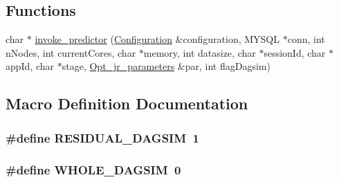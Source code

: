 \subsection*{Functions}
\begin{DoxyCompactItemize}
\item 
char $\ast$ \hyperlink{invoke__predictor_8hh_a08c78503a3848b016487ab7d31fd9074}{invoke\-\_\-predictor} (\hyperlink{classConfiguration}{Configuration} \&configuration, M\-Y\-S\-Q\-L $\ast$conn, int n\-Nodes, int current\-Cores, char $\ast$memory, int datasize, char $\ast$session\-Id, char $\ast$app\-Id, char $\ast$stage, \hyperlink{classOpt__jr__parameters}{Opt\-\_\-jr\-\_\-parameters} \&par, int flag\-Dagsim)
\end{DoxyCompactItemize}


\subsection{Macro Definition Documentation}
\hypertarget{invoke__predictor_8hh_a016c9fba38e790ceafd4d9843f2dc564}{
\subsubsection[{R\-E\-S\-I\-D\-U\-A\-L\-\_\-\-D\-A\-G\-S\-I\-M}]{\setlength{\rightskip}{0pt plus 5cm}\#define R\-E\-S\-I\-D\-U\-A\-L\-\_\-\-D\-A\-G\-S\-I\-M~1}}\label{invoke__predictor_8hh_a016c9fba38e790ceafd4d9843f2dc564}
\hypertarget{invoke__predictor_8hh_a3806de5f70b6971cfe8be82520f4bf2a}{
\subsubsection[{W\-H\-O\-L\-E\-\_\-\-D\-A\-G\-S\-I\-M}]{\setlength{\rightskip}{0pt plus 5cm}\#define W\-H\-O\-L\-E\-\_\-\-D\-A\-G\-S\-I\-M~0}}\label{invoke__predictor_8hh_a3806de5f70b6971cfe8be82520f4bf2a}


